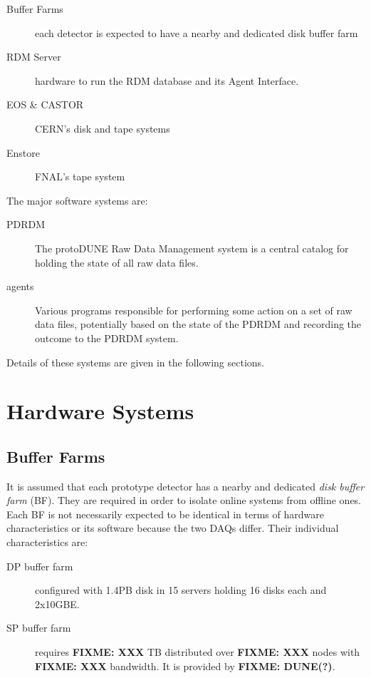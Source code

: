 \documentclass[pdftex,12pt,letter]{article}
\newcommand{\fixme}[1]{\textbf{FIXME: #1}}
\begin{document}
\begin{description}
\item[Buffer Farms] each detector is expected to have a nearby and
  dedicated disk buffer farm
\item[RDM Server] hardware to run the RDM database and its Agent Interface.
\item[EOS \& CASTOR] CERN's disk and tape systems
\item[Enstore] FNAL's tape system

\end{description}

\noindent The major software systems are:

\begin{description}
\item[PDRDM] The protoDUNE Raw Data Management system is a central
  catalog for holding the state of all raw data files.
\item[agents] Various programs responsible for performing some action
  on a set of raw data files, potentially based on the state of the
  PDRDM and recording the outcome to the PDRDM system.
\end{description}

\noindent Details of these systems are given in the following sections.

\section{Hardware Systems}

\subsection{Buffer Farms}

It is assumed that each prototype detector has a nearby and dedicated
\textit{disk buffer farm} (BF).  They are required in order to isolate
online systems from offline ones.  Each BF is not necessarily expected
to be identical in terms of hardware characteristics or its software
because the two DAQs differ.  Their individual characteristics are:

\begin{description}
\item[DP buffer farm] configured with 1.4PB disk in 15 servers holding 16 disks each and 2x10GBE.~\cite{marteau}
\item[SP buffer farm] requires \fixme{XXX} TB distributed over
  \fixme{XXX} nodes with \fixme{XXX} bandwidth.  It is provided by
  \fixme{DUNE(?)}.
\end{description}
\end{document}
